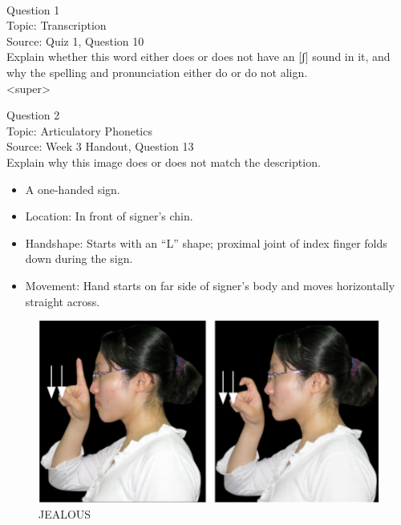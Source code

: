 \documentclass[12pt]{article}
\begin{document}
\newpage

\begin{center}
\textbf{{\color{red}{\HUGE END OF EXAM}}}\\

\end{center}
\newpage

\begin{center}
\textbf{{\color{blue}{\HUGE START OF EXAM\\}}}

\textbf{{\color{blue}{\HUGE Student ID: 66007\\}}}

\textbf{{\color{blue}{\HUGE \\}}}

\end{center}
\newpage

{\large Question 1}\\

Topic: Transcription\\
Source: Quiz 1, Question 10\\

Explain whether this word either does or does not have an [ʃ] sound in it, and why the spelling and pronunciation either do or do not align.\\

<super>


\newpage

{\large Question 2}\\

Topic: Articulatory Phonetics\\
Source: Week 3 Handout, Question 13\\

Explain why this image does or does not match the description.\\

\begin{itemize} \item A one-handed sign. \item Location: In front of signer’s chin. \item Handshape: Starts with an “L” shape; proximal joint of index finger folds down during the sign. \item Movement: Hand starts on far side of signer’s body and moves horizontally straight across. \end{itemize}

\begin{figure}[H]
\includegraphics{../images/taiwansign_jealous.png}
\caption{JEALOUS}
\end{figure}
\end{document}
